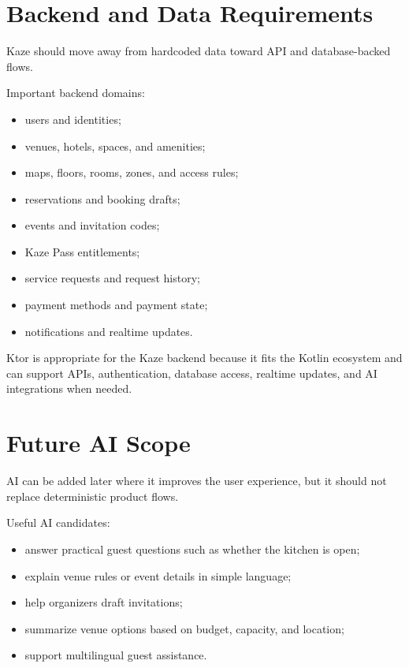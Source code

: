 \documentclass[11pt,a4paper]{article}
\begin{document}
\section{Backend and Data Requirements}

Kaze should move away from hardcoded data toward API and database-backed flows.

Important backend domains:

\begin{itemize}
    \item users and identities;
    \item venues, hotels, spaces, and amenities;
    \item maps, floors, rooms, zones, and access rules;
    \item reservations and booking drafts;
    \item events and invitation codes;
    \item Kaze Pass entitlements;
    \item service requests and request history;
    \item payment methods and payment state;
    \item notifications and realtime updates.
\end{itemize}

\begin{kazecalloutbox}
Ktor is appropriate for the Kaze backend because it fits the Kotlin ecosystem and can support APIs, authentication, database access, realtime updates, and AI integrations when needed.
\end{kazecalloutbox}

\section{Future AI Scope}

AI can be added later where it improves the user experience, but it should not replace deterministic product flows.

Useful AI candidates:

\begin{itemize}
    \item answer practical guest questions such as whether the kitchen is open;
    \item explain venue rules or event details in simple language;
    \item help organizers draft invitations;
    \item summarize venue options based on budget, capacity, and location;
    \item support multilingual guest assistance.
\end{itemize}
\end{document}
